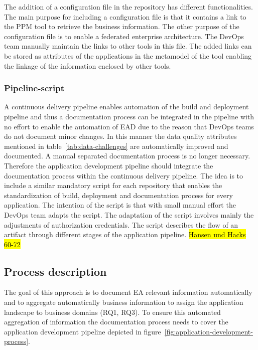 The addition of a configuration file in the repository has different functionalities. The main purpose for including a configuration file is that it contains a link to the PPM tool to retrieve the business information. The other purpose of the configuration file is to enable a federated enterprise architecture. The DevOps team manually maintain the links to other tools in this file. The added links can be stored as attributes of the applications in the metamodel of the tool enabling the linkage of the information enclosed by other tools.

\subsubsection{Pipeline-script}

A continuous delivery pipeline enables automation of the build and deployment pipeline and thus a documentation process can be integrated in the pipeline with no effort to enable the automation of EAD due to the reason that DevOps teams do not document minor changes. 
In this manner the data quality attributes mentioned in table~\ref{tab:data-challenges} are automatically improved and documented. A manual separated documentation process is no longer necessary. Therefore the application development pipeline should integrate the documentation process within the continuous delivery pipeline. The idea is to include a similar mandatory script for each repository that enables the standardization of build, deployment and documentation process for every application. The intention of the script is that with small manual effort the DevOps team adapts the script. The adaptation of the script involves mainly the adjustments of authorization credentials. The script describes the flow of an artifact through different stages of the application pipeline. \hl{Hansen und Hacks 60-72}

\subsection{Process description}\label{subsection:processdescription}

The goal of this approach is to document EA relevant information automatically and to aggregate automatically business information to assign the application landscape to business domains (RQ1, RQ3). To ensure this automated aggregation of information the documentation process needs to cover the application development pipeline depicted in figure~\ref{fig:application-development-process}.

